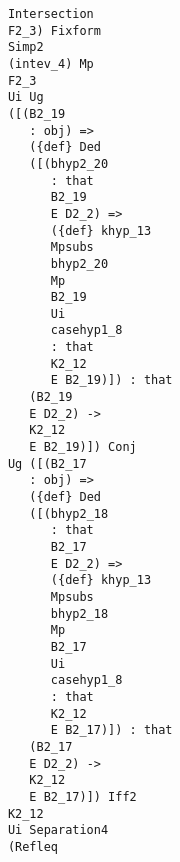 \documentclass[12pt]{article}
\begin{document}
\begin{verbatim}
                                     Intersection 
                                     F2_3) Fixform 
                                     Simp2 
                                     (intev_4) Mp 
                                     F2_3 
                                     Ui Ug 
                                     ([(B2_19 
                                        : obj) => 
                                        ({def} Ded 
                                        ([(bhyp2_20 
                                           : that 
                                           B2_19 
                                           E D2_2) => 
                                           ({def} khyp_13 
                                           Mpsubs 
                                           bhyp2_20 
                                           Mp 
                                           B2_19 
                                           Ui 
                                           casehyp1_8 
                                           : that 
                                           K2_12 
                                           E B2_19)]) : that 
                                        (B2_19 
                                        E D2_2) -> 
                                        K2_12 
                                        E B2_19)]) Conj 
                                     Ug ([(B2_17 
                                        : obj) => 
                                        ({def} Ded 
                                        ([(bhyp2_18 
                                           : that 
                                           B2_17 
                                           E D2_2) => 
                                           ({def} khyp_13 
                                           Mpsubs 
                                           bhyp2_18 
                                           Mp 
                                           B2_17 
                                           Ui 
                                           casehyp1_8 
                                           : that 
                                           K2_12 
                                           E B2_17)]) : that 
                                        (B2_17 
                                        E D2_2) -> 
                                        K2_12 
                                        E B2_17)]) Iff2 
                                     K2_12 
                                     Ui Separation4 
                                     (Refleq 

\end{verbatim}
\end{document}
